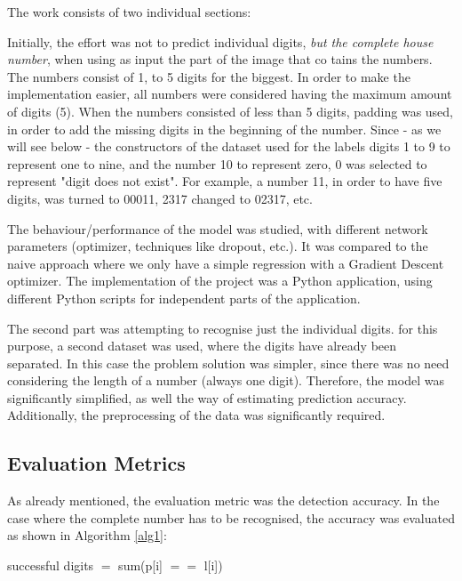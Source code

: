 \documentclass[final,12p,times]{elsarticle}
\providecommand{\SetAlgoLined}{\SetLine}
\begin{document}
The work consists of two individual sections:
\begin{Itemize}
\item Initially, the effort was not to predict individual digits, \emph{but the complete house number}, when using as input the 
part of the image that co tains the numbers.
The numbers consist of 1, to 5 digits for the biggest.
In order to make the implementation easier, all numbers were considered having the maximum amount of digits (5).
When the numbers consisted of less than 5 digits, padding was used, in order to add the missing digits in the 
beginning of the number.
Since - as we will see below - the constructors of the dataset used for the labels digits 1 to 9 to represent one to nine,
and the number 10 to represent zero, 0 was selected to represent "digit does not exist".
For example, a number 11, in order to have five digits, was turned to 00011, 2317 changed to 02317, etc.

The behaviour/performance of the model was studied, with different network parameters (optimizer, techniques like dropout, 
etc.).
It was compared to the naive approach where we only have a simple regression with a Gradient Descent optimizer. 
The implementation of the project was a Python application, using different Python scripts for independent parts of the 
application.
\item The second part was attempting to recognise just the individual digits. for this purpose, a second dataset was used, where
the digits have already been separated.
In this case the problem solution was simpler, since there was no need considering the length of a number (always one digit).
Therefore, the model was significantly simplified, as well the way of estimating prediction accuracy.
Additionally, the preprocessing of the data was significantly required.
 
\subsection{Evaluation Metrics}
\label{sec:3.2}

As already mentioned, the evaluation metric was the detection accuracy.
In the case where the complete number has to be recognised, the accuracy was evaluated as shown in Algorithm \ref{alg1}:


\begin{algorithm}[H]
 \SetAlgoLined
   {
	successful digits $=$ sum(p[i] $=$$=$ l[i])}
	   

\end{algorithm}
\end{Itemize}
\end{document}
